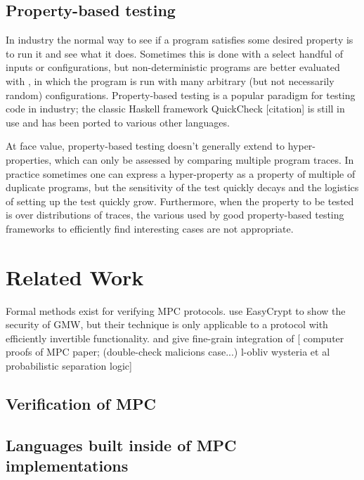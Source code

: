 \documentclass[conference]{IEEEtran}
\begin{document}
\subsection{Property-based testing}

In industry the normal way to see if a program satisfies some desired property is to run it and see what it does.
Sometimes this is done with a select handful of inputs or configurations,
but non-deterministic programs are better evaluated with ,
in which the program is run with many arbitrary (but not necessarily random) configurations.
Property-based testing is a popular paradigm for testing code in industry;
the classic Haskell framework QuickCheck [citation] %
is still in use and has been ported to various other languages.

At face value, property-based testing doesn't generally extend to hyper-properties,
which can only be assessed by comparing multiple program traces.
In practice sometimes one can express a hyper-property as a property of multiple of duplicate programs,
but the sensitivity of the test quickly decays and the logistics of setting up the test quickly grow.
Furthermore, when the property to be tested is over distributions of traces,
the various used by good property-based testing frameworks to efficiently find interesting cases are not appropriate.


\section{Related Work}

Formal methods exist for verifying MPC protocols.
\cite{https://arxiv.org/pdf/1806.07197.pdf} %
use EasyCrypt to show the security of GMW,
but their technique is only applicable to a protocol with efficiently invertible functionality. 
and
\cite{Wysteria} %
give fine-grain integration of 
[ computer proofs of MPC paper; (double-check malicions case...)
  l-obliv
  wysteria et al
  probabilistic separation logic]
\subsection{Verification of MPC}


\subsection{Languages built inside of MPC implementations}
\end{document}
